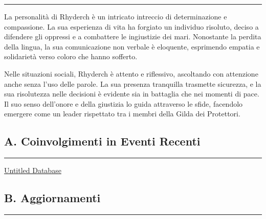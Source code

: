 \begin{center}\rule{0.5\linewidth}{0.5pt}\end{center}

La personalità di Rhyderch è un intricato intreccio di determinazione e
compassione. La sua esperienza di vita ha forgiato un individuo
risoluto, deciso a difendere gli oppressi e a combattere le ingiustizie
dei mari. Nonostante la perdita della lingua, la sua comunicazione non
verbale è eloquente, esprimendo empatia e solidarietà verso coloro che
hanno sofferto.

Nelle situazioni sociali, Rhyderch è attento e riflessivo, ascoltando
con attenzione anche senza l'uso delle parole. La sua presenza
tranquilla trasmette sicurezza, e la sua risolutezza nelle decisioni è
evidente sia in battaglia che nei momenti di pace. Il suo senso
dell'onore e della giustizia lo guida attraverso le sfide, facendolo
emergere come un leader rispettato tra i membri della Gilda dei
Protettori.

\subsection{A. Coinvolgimenti in Eventi
Recenti}\label{a.-coinvolgimenti-in-eventi-recenti}

\begin{center}\rule{0.5\linewidth}{0.5pt}\end{center}

\href{Untitled\%20Database\%20895b8280d00349d8b81d32eab032133f.csv}{Untitled
Database}

\subsection{B. Aggiornamenti}\label{b.-aggiornamenti}

\begin{center}\rule{0.5\linewidth}{0.5pt}\end{center}

\href{Untitled\%20c4a53933cd0a4b9dbbead926bfd528d4.csv}{}
